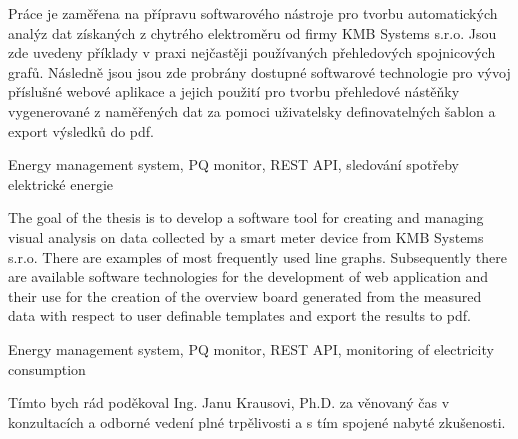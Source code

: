 \documentclass[FM,BP]{tulthesis}
\begin{document}

\begin{abstractEN}
    Práce je zaměřena na přípravu softwarového nástroje pro tvorbu automatických analýz dat získaných z chytrého elektroměru od firmy KMB Systems s.r.o. Jsou zde uvedeny příklady v praxi nejčastěji používaných přehledových spojnicových grafů. Následně jsou jsou zde probrány dostupné softwarové technologie pro vývoj příslušné webové aplikace a jejich použití pro tvorbu přehledové nástěňky vygenerované z naměřených dat za pomoci uživatelsky definovatelných šablon a export výsledků do pdf.
\end{abstractEN}

\begin{keywordsEN}
    Energy management system, PQ monitor, REST API, sledování spotřeby elektrické energie
\end{keywordsEN}

\begin{abstractCZ}
    The goal of the thesis is to develop a software tool for creating and managing visual analysis on data collected by a smart meter device from KMB Systems s.r.o. There are examples of most frequently used line graphs. Subsequently there are available software technologies for the development of web application and their use for the creation of the overview board generated from the measured data with respect to user definable templates and export the results to pdf.
\end{abstractCZ}


\begin{keywordsCZ}
    Energy management system, PQ monitor, REST API, monitoring of electricity consumption
\end{keywordsCZ}

\vspace{2cm}



\clearpage

\begin{acknowledgement}
    Tímto bych rád poděkoval Ing. Janu Krausovi, Ph.D. za věnovaný čas v konzultacích a odborné vedení plné trpělivosti a s tím spojené nabyté zkušenosti.
\end{acknowledgement}

\tableofcontents
\listoffigures

\clearpage
\end{document}
